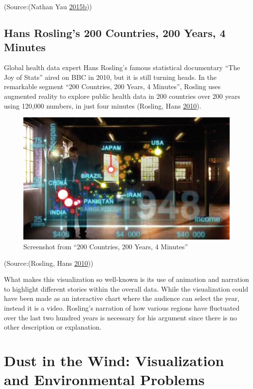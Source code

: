 \documentclass[]{book}
\begin{document}
(Source:(Nathan Yau
\protect\hyperlink{ref-American_life}{2015}\protect\hyperlink{ref-American_life}{b}))

\subsection{Hans Rosling's 200 Countries, 200 Years, 4
Minutes}\label{hans-roslings-200-countries-200-years-4-minutes}

Global health data expert Hans Rosling's famous statistical documentary
``The Joy of Stats'' aired on BBC in 2010, but it is still turning
heads. In the remarkable segment ``200 Countries, 200 Years, 4
Minutes'', Rosling uses augmented reality to explore public health data
in 200 countries over 200 years using 120,000 numbers, in just four
minutes (Rosling, Hans \protect\hyperlink{ref-hans_rosling}{2010}).

\begin{figure}
\centering
\includegraphics{images/200_countries_years.png}
\caption{Screenshot from ``200 Countries, 200 Years, 4 Minutes''}
\end{figure}

(Source:(Rosling, Hans \protect\hyperlink{ref-hans_rosling}{2010}))

What makes this visualization so well-known is its use of animation and
narration to highlight different stories within the overall data. While
the visualization could have been made as an interactive chart where the
audience can select the year, instead it is a video. Rosling's narration
of how various regions have fluctuated over the last two hundred years
is necessary for his argument since there is no other description or
explanation.

\section{Dust in the Wind: Visualization and Environmental
Problems}\label{dust-in-the-wind-visualization-and-environmental-problems}
\end{document}
